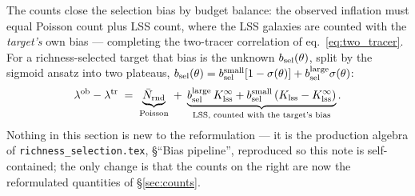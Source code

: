 \documentclass[a4paper, 11pt]{article}
\newcommand{\lob}{\lambda^{\rm ob}}
\newcommand{\ltr}{\lambda^{\rm tr}}
\newcommand{\bsel}{b_{\rm sel}}
\newcommand{\bsmall}{b_{\rm sel}^{\rm small}}
\newcommand{\blarge}{b_{\rm sel}^{\rm large}}
\newcommand{\Nbar}{\bar{N}_{\rm rnd}}
\newcommand{\Klss}{K_{\rm lss}}
\newcommand{\KlssInf}{K_{\rm lss}^{\infty}}
\begin{document}
The counts close the selection bias by budget balance: the
observed inflation must equal Poisson count plus LSS count, where
the LSS galaxies are counted with the \emph{target's} own bias
--- completing the two-tracer correlation of
eq.~\eqref{eq:two_tracer}. For a richness-selected target that
bias is the unknown $\bsel(\theta)$, split by the sigmoid ansatz
into two plateaus,
$\bsel(\theta) = \bsmall[1-\sigma(\theta)]+\blarge\sigma(\theta)$:
\begin{equation}
\lob-\ltr
\;=\; \underbrace{\Nbar}_{\text{Poisson}}
\;+\; \underbrace{\blarge\,\KlssInf + \bsmall\,(\Klss-\KlssInf)}_{\text{LSS,
counted with the target's bias}}.
\label{eq:budget}
\end{equation}
Nothing in this section is new to the reformulation --- it is the
production algebra of \texttt{richness\_selection.tex},
\S``Bias pipeline'', reproduced so this note is self-contained;
the only change is that the counts on the right are now the
reformulated quantities of \S\ref{sec:counts}.
\end{document}
